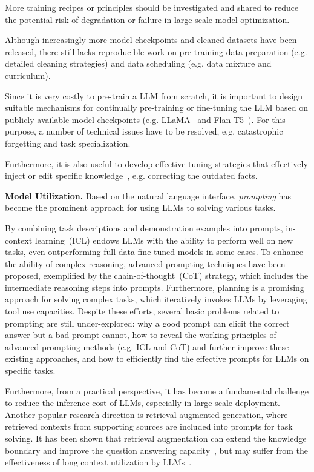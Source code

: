 More training recipes or principles should be investigated and shared to reduce the potential  risk of degradation or failure in large-scale model optimization.  

Although increasingly more model checkpoints and cleaned datasets have been released, there still lacks  reproducible work on pre-training data preparation (e.g. detailed cleaning strategies) and data scheduling (e.g. data mixture and curriculum).   

Since it is very costly to pre-train a LLM from scratch, it is  important to design suitable mechanisms for continually pre-training or fine-tuning the LLM based on publicly available model checkpoints (e.g. LLaMA~\cite{Touvron-arxiv-2023-LLaMA} and Flan-T5~\cite{Chung-arxiv-2022-Scaling}). For this purpose, a number of technical issues have to be resolved, e.g. catastrophic forgetting and task specialization.   

{Furthermore, it is also useful to develop effective tuning strategies that effectively inject or edit specific knowledge~\cite{Yao-arxiv-2023-Editing}, e.g. correcting the outdated facts.}

\textbf{Model Utilization.} Based on the natural language interface, \emph{prompting} has become the prominent approach for using LLMs to solving various tasks. 

By combining task descriptions and demonstration examples into prompts, in-context learning~(ICL) endows LLMs with the ability to perform well on new tasks, even outperforming full-data fine-tuned models in some cases. To enhance the ability of complex reasoning, advanced prompting techniques have been proposed,  exemplified by the chain-of-thought~(CoT) strategy, which includes the intermediate reasoning steps into prompts. Furthermore, planning is a promising approach for solving  complex tasks, which iteratively  invokes LLMs by leveraging tool use capacities. Despite these efforts, several basic  problems related to prompting are still  under-explored:   why a good prompt can elicit the correct answer but a bad prompt cannot,  how to reveal the working principles of advanced prompting methods (e.g. ICL and  CoT) and  further improve these existing approaches, and how to efficiently find the effective prompts for  LLMs on  specific tasks.     

Furthermore, from a practical perspective, it has become a fundamental challenge to reduce the inference cost of LLMs, especially in large-scale deployment. Another popular research direction is  retrieval-augmented generation, where retrieved contexts from supporting sources are included into prompts for task solving. It has been shown that retrieval augmentation can extend the knowledge boundary and improve the question answering capacity~\cite{Ren-arxiv-2023-Investigating}, but may suffer from the effectiveness of long context utilization by LLMs~\cite{Liu-arxiv-2023-Lost}. 


